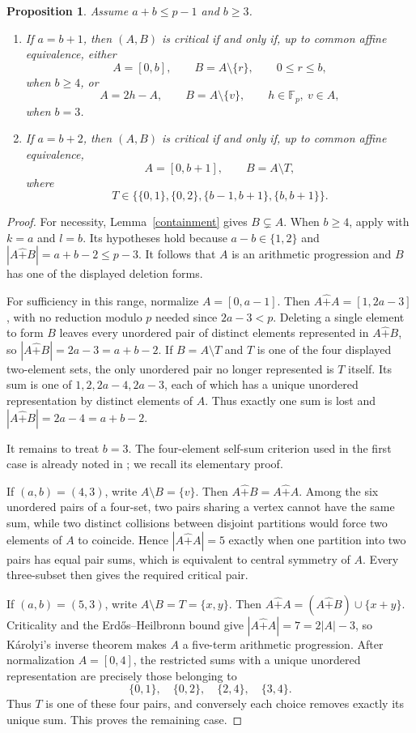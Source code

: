 \documentclass[10pt,a4paper]{amsart}
\newtheorem{proposition}{Proposition}[section]
\newcommand{\F}{\mathbb{F}_p}
\newcommand{\rs}{\mathbin{\widehat+}}
\begin{document}
\begin{proposition}\label{smallgapclassification}
Assume $a+b\le p-1$ and $b\ge3$.
\begin{enumerate}[label=\textup{(\roman*)},nosep]
\item If $a=b+1$, then $(A,B)$ is critical if and only if, up to common
affine equivalence, either
\[
 A=[0,b],\qquad B=A\setminus\{r\},\qquad 0\le r\le b,
\]
when $b\ge4$, or
\[
 A=2h-A,\qquad B=A\setminus\{v\},\qquad h\in\F,\ v\in A,
\]
when $b=3$.
\item If $a=b+2$, then $(A,B)$ is critical if and only if, up to common
affine equivalence,
\[
 A=[0,b+1],\qquad B=A\setminus T,
\]
where
\[
 T\in\bigl\{\{0,1\},\{0,2\},\{b-1,b+1\},\{b,b+1\}\bigr\}.
\]
\end{enumerate}
\end{proposition}
\begin{proof}
For necessity, Lemma~\ref{containment} gives $B\subsetneq A$.
When $b\ge4$, apply \cite[Proposition 3.4]{LQ} with $k=a$ and $l=b$.
Its hypotheses hold because $a-b\in\{1,2\}$ and
$|A\rs B|=a+b-2\le p-3$.  It follows that $A$ is an arithmetic
progression and $B$ has one of the displayed deletion forms.

For sufficiency in this range, normalize $A=[0,a-1]$.
Then $A\rs A=[1,2a-3]$, with no reduction modulo $p$ needed since
$2a-3<p$.  Deleting a single element to form $B$ leaves every
unordered pair of distinct elements represented in $A\rs B$, so
$|A\rs B|=2a-3=a+b-2$.  If $B=A\setminus T$ and $T$ is one of the
four displayed two-element sets, the only unordered pair no longer
represented is $T$ itself.  Its sum is one of
$1,2,2a-4,2a-3$, each of which has a unique unordered representation
by distinct elements of $A$.  Thus exactly one sum is lost and
$|A\rs B|=2a-4=a+b-2$.

It remains to treat $b=3$.  The four-element self-sum criterion used
in the first case is already noted in \cite[Section 1]{Karolyi}; we
recall its elementary proof.

If $(a,b)=(4,3)$, write $A\setminus B=\{v\}$.  Then
$A\rs B=A\rs A$.  Among the six unordered pairs of a four-set, two
pairs sharing a vertex cannot have the same sum, while two distinct
collisions between disjoint partitions would force two elements of
$A$ to coincide.  Hence $|A\rs A|=5$ exactly when one partition into two pairs
has equal pair sums, which is equivalent to central symmetry of
$A$.  Every three-subset then gives the required critical pair.

If $(a,b)=(5,3)$, write $A\setminus B=T=\{x,y\}$.  Then
$A\rs A=(A\rs B)\cup\{x+y\}$.  Criticality and the Erd\H{o}s--Heilbronn bound give
$|A\rs A|=7=2|A|-3$, so K\'arolyi's inverse theorem \cite[Theorem 7]{Karolyi}
makes $A$ a five-term arithmetic progression.  After normalization
$A=[0,4]$, the restricted sums with a unique unordered representation
are precisely those belonging to
\[
 \{0,1\},\quad\{0,2\},\quad\{2,4\},\quad\{3,4\}.
\]
Thus $T$ is one of these four pairs, and conversely each choice removes
exactly its unique sum.  This proves the remaining case.
\end{proof}
\end{document}
